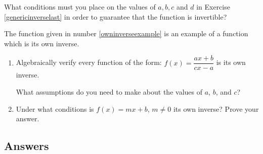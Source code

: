 \begin{exenum}
\item \label{whatconditions} What conditions must you place on the values of $a, b, c$ and $d$ in Exercise \ref{genericinverselast} in order to guarantee that the function is invertible?

\item  The function given in number \ref{owninverseexample} is an example of a function which is its own inverse.  

\begin{enumerate}

\item Algebraically verify every function of the form: $f(x) = \dfrac{ax + b}{cx - a}$ is its own inverse.  

What assumptions do you need to make about the values of  $a$, $b$, and $c$?

\item  Under what conditions is $f(x) = mx + b$, $m \neq 0$ its own inverse?  Prove your answer.

\end{enumerate}

\end{exenum}

\clearpage

\subsection{Answers}
\startexenum

